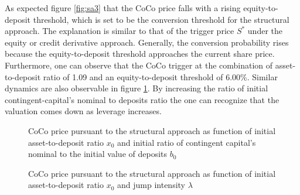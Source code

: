 As expected figure \ref{fig:sa3} that the CoCo price falls with a rising equity-to-deposit threshold, which is set to be the conversion threshold for the structural approach. The explanation is similar to that of the trigger price $S^*$ under the equity or credit derivative approach. Generally, the conversion probability rises because the equity-to-deposit threshold approaches the current share price. Furthermore, one can observe that the CoCo trigger at the combination of asset-to-deposit ratio of 1.09 and an equity-to-deposit threshold of 6.00\%. Similar dynamics are also observable in figure \ref{fig:sa5}. By increasing the ratio of initial contingent-capital's nominal to deposits ratio the one can recognize that the valuation comes down as leverage increases. 

\begin{figure}[H]
\centering
    \caption[CoCo price pursuant to the structural approach as function of asset-to-deposit ratio and initial ratio of contingent capital's nominal to deposits]{CoCo price pursuant to the structural approach as function of initial asset-to-deposit ratio $x_0$ and initial ratio of contingent capital's nominal to the initial value of deposits $b_0$}
  \label{fig:sa5}
  \end{figure}

\begin{figure}[H]
\centering
    \caption[CoCo price pursuant to the structural approach as function of asset-to-deposit ratio and jump intensity]{CoCo price pursuant to the structural approach as function of initial asset-to-deposit ratio $x_0$ and jump intensity $\lambda$}
  \label{fig:sa4}
  \end{figure}
  
